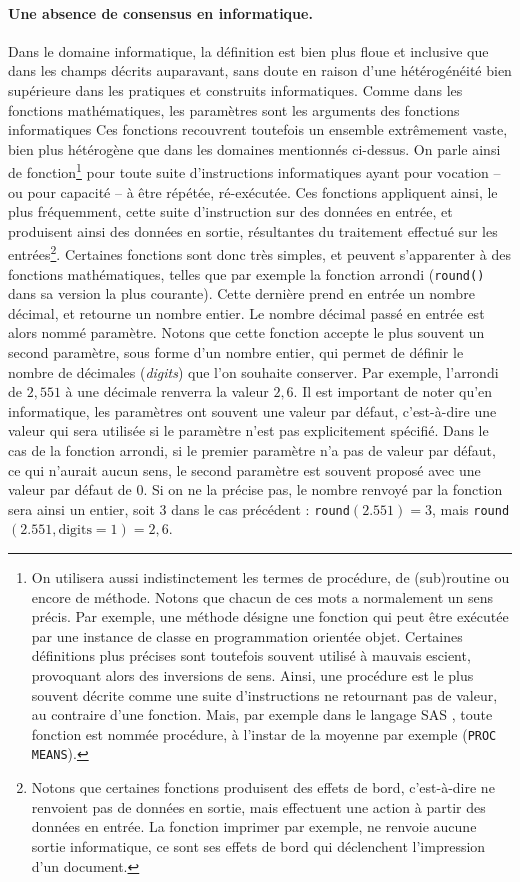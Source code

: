 \paragraph{Une absence de consensus en informatique.}
Dans le domaine informatique, la définition est bien plus floue et inclusive que dans les champs décrits auparavant, sans doute en raison d'une hétérogénéité bien supérieure dans les pratiques et construits informatiques.
Comme dans les fonctions mathématiques, les paramètres sont les arguments des fonctions informatiques
Ces fonctions recouvrent toutefois un ensemble extrêmement vaste, bien plus hétérogène que dans les domaines mentionnés ci-dessus.
On parle ainsi de fonction\footnote{
	On utilisera aussi indistinctement les termes de procédure, de (sub)routine ou encore de méthode.
	Notons que chacun de ces mots a normalement un sens précis.
	Par exemple, une méthode désigne une fonction qui peut être exécutée par une instance de classe en programmation orientée objet.
	Certaines définitions plus précises sont toutefois souvent utilisé à mauvais escient, provoquant alors des inversions de sens.
	Ainsi, une procédure est le plus souvent décrite comme une suite d'instructions ne retournant pas de valeur, au contraire d'une fonction.
	Mais, par exemple dans le langage SAS \autocite{sas1990sas}, toute fonction est nommée procédure, à l'instar de la moyenne par exemple (\texttt{PROC MEANS}).
} pour toute suite d'instructions informatiques ayant pour vocation -- ou pour capacité -- à être répétée, ré-exécutée.
Ces fonctions appliquent ainsi, le plus fréquemment, cette suite d'instruction sur des données en entrée, et produisent ainsi des données en sortie, résultantes du traitement effectué sur les entrées\footnote{
	Notons que certaines fonctions produisent des \og effets de bord\fg{}, c'est-à-dire ne renvoient pas de données en sortie, mais effectuent une action à partir des données en entrée.
	La fonction imprimer par exemple, ne renvoie aucune sortie informatique, ce sont ses effets de bord qui déclenchent l'impression d'un document.
}.
Certaines fonctions sont donc très simples, et peuvent s'apparenter à des fonctions mathématiques, telles que par exemple la fonction arrondi (\texttt{round()} dans sa version la plus courante).
Cette dernière prend en entrée un nombre décimal, et retourne un nombre entier.
Le nombre décimal passé en entrée est alors nommé paramètre. Notons que cette fonction accepte le plus souvent un second paramètre, sous forme d'un nombre entier, qui permet de définir le nombre de décimales (\textit{digits}) que l'on souhaite conserver.
Par exemple, l'arrondi de $2,551$ à une décimale renverra la valeur $2,6$.
Il est important de noter qu'en informatique, les paramètres ont souvent une \og valeur par défaut\fg{}, c'est-à-dire une valeur qui sera utilisée si le paramètre n'est pas explicitement spécifié.
Dans le cas de la fonction arrondi, si le premier paramètre n'a pas de valeur par défaut, ce qui n'aurait aucun sens, le second paramètre est souvent proposé avec une valeur par défaut de $0$.
Si on ne la précise pas, le nombre renvoyé par la fonction sera ainsi un entier, soit $3$ dans le cas précédent :
\texttt{round}$(2.551) = 3$, mais \texttt{round}$(2.551, \text{digits} = 1) = 2,6$.

